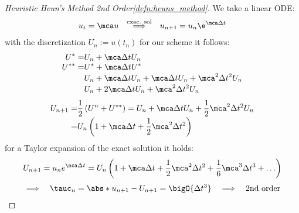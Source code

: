 \begin{proofbox}\nospacing
    \begin{proof}[Heuristic Heun's Method 2nd Order\cref{defn:heuns_method}]\label{proof:defn:heuns_method_order}
        We take a linear ODE:
        \begin{align*}
          u_{t}=\mca u&&\stackrel{\text{exac. sol}}{\implies}&&
                                                                u_{n+1}=u_{n}\e^{\mca\Delta t}
        \end{align*}
        with the discretization $U_{n}:=u(t_{n})$ for our scheme it follows:
        \begin{align*}
          U^{*}=&U_{n}+\mca\Delta t U_{n}\\[-1\jot]
          U^{**}=&U^{*}+\mca\Delta t U^{*}\\[-1\jot]
                &U_{n}+\mca\Delta t U_{n}+\mca\Delta t U_{n}+\mca^{2}\Delta t^{2} U_{n}\\[-1\jot]
                &U_{n}+2\mca\Delta t U_{n}+\mca^{2}\Delta t^{2} U_{n}
        \end{align*}
        \begin{align*}
          U_{n+1}=&\frac{1}{2}\left(U^{n}+U^{**}\right)=U_{n}+\mca\Delta t U_{n}+\frac{1}{2}\mca^{2}\Delta t^{2} U_{n}\\[-1\jot]
          =&U_{n}\left(1+\mca\Delta t+\frac{1}{2}\mca^{2}\Delta t^{2}\right)
        \end{align*}
        for a Taylor expansion of the exact solution it holds:
        \begin{align*}
          U_{n+1}=u_{n}e^{\mca\Delta t}=U_{n} \left(1+\mca\Delta t+\frac{1}{2}\mca^{2}\Delta t^{2}+\frac{1}{6}\mca^{3}\Delta t^{3}+\ldots\right)
        \end{align*}
        \begin{align*}
          \implies&&\tauc_{n}=\abs*{u_{n+1}-U_{n+1}}=\bigO{\Delta t^{3}}&&\implies&&\text{2nd order}
        \end{align*}
    \end{proof}
\end{proofbox}
